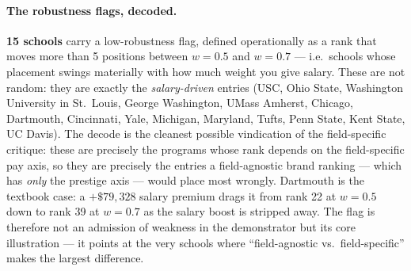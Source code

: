 \documentclass[11pt]{article}
\begin{document}
\paragraph{The robustness flags, decoded.} \textbf{15 schools} carry a low-robustness flag, defined operationally as a rank that moves more than 5 positions between $w=0.5$ and $w=0.7$ --- i.e.\ schools whose placement swings materially with how much weight you give salary. These are not random: they are exactly the \emph{salary-driven} entries (USC, Ohio State, Washington University in St.\ Louis, George Washington, UMass Amherst, Chicago, Dartmouth, Cincinnati, Yale, Michigan, Maryland, Tufts, Penn State, Kent State, UC Davis). The decode is the cleanest possible vindication of the field-specific critique: these are precisely the programs whose rank depends on the field-specific pay axis, so they are precisely the entries a field-agnostic brand ranking --- which has \emph{only} the prestige axis --- would place most wrongly. Dartmouth is the textbook case: a $+\$79{,}328$ salary premium drags it from rank 22 at $w=0.5$ down to rank 39 at $w=0.7$ as the salary boost is stripped away. The flag is therefore not an admission of weakness in the demonstrator but its core illustration --- it points at the very schools where ``field-agnostic vs.\ field-specific'' makes the largest difference.
\end{document}
